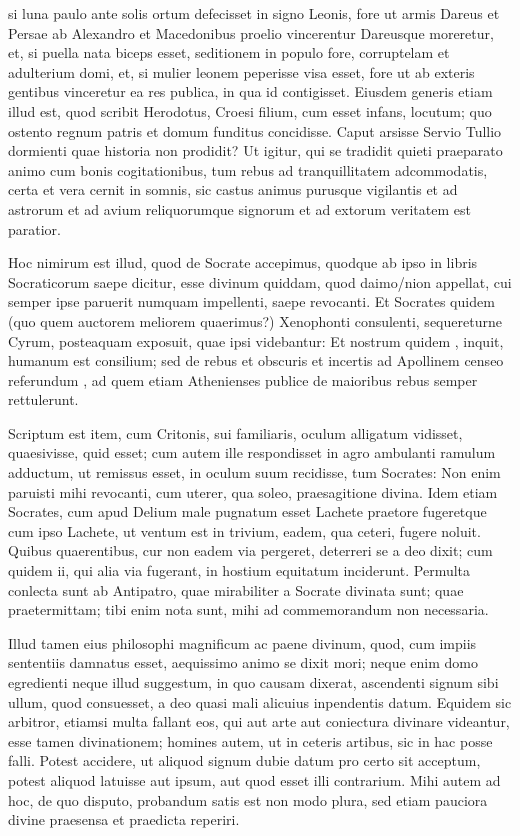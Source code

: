  si luna paulo ante solis ortum defecisset in signo Leonis, fore ut armis Dareus et Persae ab Alexandro et Macedonibus proelio vincerentur Dareusque moreretur, et, si puella nata biceps esset, seditionem in populo fore, corruptelam et adulterium domi, et, si mulier leonem peperisse visa esset, fore ut ab exteris gentibus vinceretur ea res publica, in qua id contigisset. Eiusdem generis etiam illud est, quod scribit Herodotus, Croesi filium, cum esset infans, locutum; quo ostento regnum patris et domum funditus concidisse. Caput arsisse Servio Tullio dormienti quae historia non prodidit? Ut igitur, qui se tradidit quieti praeparato animo cum bonis cogitationibus, tum rebus ad tranquillitatem adcommodatis, certa et vera cernit in somnis, sic castus animus purusque vigilantis et ad astrorum et ad avium reliquorumque signorum et ad extorum veritatem est paratior.

 Hoc nimirum est illud, quod de Socrate accepimus, quodque ab ipso in libris Socraticorum saepe dicitur, esse divinum quiddam, quod daimo/nion appellat, cui semper ipse paruerit numquam impellenti, saepe revocanti. Et Socrates quidem (quo quem auctorem meliorem quaerimus?) Xenophonti consulenti, sequereturne Cyrum, posteaquam exposuit, quae ipsi videbantur: Et nostrum quidem , inquit, humanum est consilium; sed de rebus et obscuris et incertis ad Apollinem censeo referundum , ad quem etiam Athenienses publice de maioribus rebus semper rettulerunt.

 Scriptum est item, cum Critonis, sui familiaris, oculum alligatum vidisset, quaesivisse, quid esset; cum autem ille respondisset in agro ambulanti ramulum adductum, ut remissus esset, in oculum suum recidisse, tum Socrates: Non enim paruisti mihi revocanti, cum uterer, qua soleo, praesagitione divina. Idem etiam Socrates, cum apud Delium male pugnatum esset Lachete praetore fugeretque cum ipso Lachete, ut ventum est in trivium, eadem, qua ceteri, fugere noluit. Quibus quaerentibus, cur non eadem via pergeret, deterreri se a deo dixit; cum quidem ii, qui alia via fugerant, in hostium equitatum inciderunt. Permulta conlecta sunt ab Antipatro, quae mirabiliter a Socrate divinata sunt; quae praetermittam; tibi enim nota sunt, mihi ad commemorandum non necessaria.

 Illud tamen eius philosophi magnificum ac paene divinum, quod, cum impiis sententiis damnatus esset, aequissimo animo se dixit mori; neque enim domo egredienti neque illud suggestum, in quo causam dixerat, ascendenti signum sibi ullum, quod consuesset, a deo quasi mali alicuius inpendentis datum. Equidem sic arbitror, etiamsi multa fallant eos, qui aut arte aut coniectura divinare videantur, esse tamen divinationem; homines autem, ut in ceteris artibus, sic in hac posse falli. Potest accidere, ut aliquod signum dubie datum pro certo sit acceptum, potest aliquod latuisse aut ipsum, aut quod esset illi contrarium. Mihi autem ad hoc, de quo disputo, probandum satis est non modo plura, sed etiam pauciora divine praesensa et praedicta reperiri.

